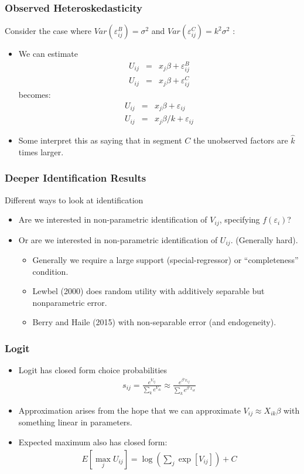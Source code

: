 \documentclass[xcolor=pdftex,dvipsnames,table,mathserif]{beamer}
\begin{document}
\begin{frame}
\frametitle{Observed Heteroskedasticity}
Consider the case where $Var(\varepsilon_{ij}^B) = \sigma^2$ and   $Var(\varepsilon_{ij}^C) =  k^2 \sigma^2$ :
\begin{itemize}
\item We can estimate
\begin{eqnarray*}
U_{ij} &=& x_j \beta + \varepsilon_{ij}^B\\
U_{ij} &=& x_j \beta + \varepsilon_{ij}^C
\end{eqnarray*}
becomes:
\begin{eqnarray*}
U_{ij} &=& x_j \beta + \varepsilon_{ij}\\
U_{ij} &=& x_j \beta/k+ \varepsilon_{ij}
\end{eqnarray*}
\item Some interpret this as saying that in segment $C$ the unobserved factors are $\hat{k}$ times larger.
\end{itemize}
\end{frame}

\begin{frame}
\frametitle{Deeper Identification Results}
Different ways to look at identification
\begin{itemize}
\item Are we interested in non-parametric identification of $V_{ij}$, specifying $f(\varepsilon_i)$?
\item Or are we interested in non-parametric identification of $U_{ij}$. (Generally hard).
\begin{itemize}
\item Generally we require a large support (special-regressor) or ``completeness'' condition.
\item Lewbel (2000) does random utility with additively separable but nonparametric error.\item Berry and Haile (2015) with non-separable error (and endogeneity).
\end{itemize}
\end{itemize}
\end{frame}


\begin{frame}
\frametitle{Logit}
\begin{itemize}
\item Logit has closed form choice probabilities
\begin{eqnarray*}
s_{ij} = \frac{e^{V_{ij}}}{\sum_k e^{V_{ik}}} \approx \frac{e^{\beta' x_{ij}}}{\sum_k e^{\beta' x_{ik}}}
\end{eqnarray*}
\item Approximation arises from the hope that we can approximate $V_{ij} \approx  X_{ik} \beta$ with something linear in parameters.
\item Expected maximum also has closed form:
\begin{eqnarray*}
E[\max_j U_{ij}] = \log \left(\sum_j \exp[V_{ij}] \right) + C
\end{eqnarray*}
\end{itemize}
\end{frame}
\end{document}
